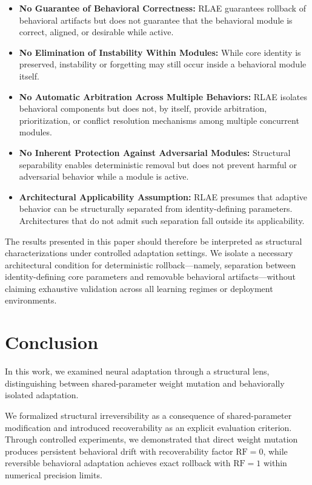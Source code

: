 \documentclass[10pt]{article}
\begin{document}
	\begin{itemize}
		\item \textbf{No Guarantee of Behavioral Correctness:}
		RLAE guarantees rollback of behavioral artifacts but does not guarantee that the behavioral module is correct, aligned, or desirable while active.
		
		\item \textbf{No Elimination of Instability Within Modules:}
		While core identity is preserved, instability or forgetting may still occur inside a behavioral module itself.
		
		\item \textbf{No Automatic Arbitration Across Multiple Behaviors:}
		RLAE isolates behavioral components but does not, by itself, provide arbitration, prioritization, or conflict resolution mechanisms among multiple concurrent modules.
		
		\item \textbf{No Inherent Protection Against Adversarial Modules:}
		Structural separability enables deterministic removal but does not prevent harmful or adversarial behavior while a module is active.
		
		\item \textbf{Architectural Applicability Assumption:}
		RLAE presumes that adaptive behavior can be structurally separated from identity-defining parameters. Architectures that do not admit such separation fall outside its applicability.
	\end{itemize}
	
	The results presented in this paper should therefore be interpreted as structural characterizations under controlled adaptation settings. We isolate a necessary architectural condition for deterministic rollback—namely, separation between identity-defining core parameters and removable behavioral artifacts—without claiming exhaustive validation across all learning regimes or deployment environments.
	
	
	\section{Conclusion}
	\label{sec:conclusion}
	
	In this work, we examined neural adaptation through a structural lens,
	distinguishing between shared-parameter weight mutation and
	behaviorally isolated adaptation.
	
	We formalized structural irreversibility as a consequence of
	shared-parameter modification and introduced recoverability
	as an explicit evaluation criterion.
	Through controlled experiments, we demonstrated that
	direct weight mutation produces persistent behavioral drift
	with recoverability factor $\mathrm{RF}=0$,
	while reversible behavioral adaptation achieves
	exact rollback with $\mathrm{RF}=1$ within numerical precision limits.
	
\end{document}
